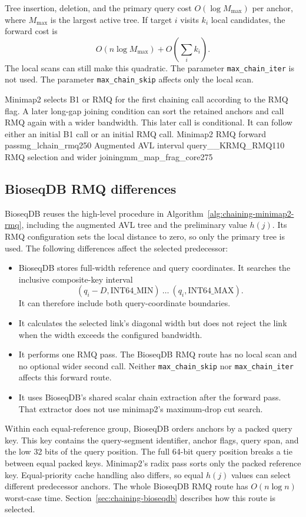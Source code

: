 Tree insertion, deletion, and the primary query cost
\(O(\log M_{\max})\) per anchor, where \(M_{\max}\) is the largest active
tree.  If target \(i\) visits \(k_i\) local candidates, the forward cost is
\[
  O(n\log M_{\max})+
  O\!\left(\sum_i k_i\right).
\]
The local scans can still make this quadratic.  The parameter
\texttt{max\_chain\_iter} is not used.  The parameter
\texttt{max\_chain\_skip} affects only the local scan.

Minimap2 selects B1 or RMQ for the first chaining call according to the RMQ
flag.  A
later long-gap joining condition can sort the retained anchors and call RMQ
again with a wider bandwidth.  This later call is conditional.  It can follow
either an initial B1 call or an initial RMQ call.
\leavevmode{}
  {Minimap2 RMQ forward pass}{mg_lchain_rmq}{250}
\leavevmode{}
  {Augmented AVL interval query}{__KRMQ_RMQ}{110}
\leavevmode{}
  {RMQ selection and wider joining}{mm_map_frag_core}{275}

\subsection{BioseqDB RMQ differences}
\label{sec:chaining-bioseqdb-rmq-summary}

BioseqDB reuses the high-level procedure in
Algorithm~\ref{alg:chaining-minimap2-rmq}, including the augmented AVL tree
and the preliminary value \(h(j)\).  Its RMQ configuration sets the local
distance to zero, so only the primary tree is used.  The following differences
affect the selected predecessor:

\begin{itemize}
  \item BioseqDB stores full-width reference and query coordinates.  It
    searches the inclusive
    composite-key interval
    \[
      (q_i-D,\mathrm{INT64\_MIN})
      \ \ldots\
      (q_i,\mathrm{INT64\_MAX}).
    \]
    It can therefore include both query-coordinate boundaries.
  \item It calculates the selected link's diagonal width but does not reject
    the link when the width exceeds the configured bandwidth.
  \item It performs one RMQ pass.  The BioseqDB RMQ route has no local scan
    and no optional wider second call.  Neither \texttt{max\_chain\_skip} nor
    \texttt{max\_chain\_iter} affects this forward route.
  \item It uses BioseqDB's shared scalar chain extraction after the forward
    pass.  That extractor does not use minimap2's maximum-drop cut search.
\end{itemize}

Within each equal-reference group, BioseqDB orders anchors by a packed query
key.  This key contains the query-segment identifier, anchor flags, query
span, and the low 32 bits of the query position.  The full 64-bit query
position breaks a tie between equal packed keys.  Minimap2's radix pass sorts
only the packed reference key.  Equal-priority cache handling also differs,
so equal \(h(j)\) values can select different predecessor anchors.  The whole
BioseqDB RMQ route has \(O(n\log n)\) worst-case time.
Section~\ref{sec:chaining-bioseqdb} describes how this route is selected.
